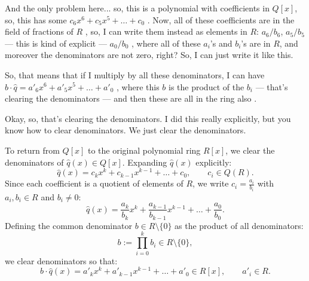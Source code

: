 \begin{proofWrapper}
\begin{speech}[00:23:05 - 00:24:54]
And the only problem here... so, this is a polynomial with coefficients in $Q[x]$, so, this has some $c_6 x^6 + c_5 x^5 + \dots + c_0$ . Now, all of these coefficients are in the field of fractions of $R$ , so, I can write them instead as elements in $R$: $a_6 / b_6$, $a_5 / b_5$ --- this is kind of explicit --- $a_0 / b_0$ , where all of these $a_i$'s and $b_i$'s are in $R$, and moreover the denominators are not zero, right? So, I can just write it like this.

So, that means that if I multiply by all these denominators, I can have $b \cdot \hat{q} = a'_6 x^6 + a'_5 x^5 + \dots + a'_0$ , where this $b$ is the product of the $b_i$  --- that's clearing the denominators --- and then these are all in the ring also .

Okay, so, that's clearing the denominators. I did this really explicitly, but you know how to clear denominators. We just clear the denominators.
\end{speech}

\begin{content}
To return from $Q[x]$ to the original polynomial ring $R[x]$, we clear the denominators of $\hat{q}(x) \in Q[x]$. Expanding $\hat{q}(x)$ explicitly:
\[
\hat{q}(x) = c_k x^k + c_{k-1} x^{k-1} + \dots + c_0, \qquad c_i \in Q(R).
\]
Since each coefficient is a quotient of elements of $R$, we write $c_i = \frac{a_i}{b_i}$ with $a_i, b_i \in R$ and $b_i \neq 0$:
\[
\hat{q}(x) = \frac{a_k}{b_k} x^k + \frac{a_{k-1}}{b_{k-1}} x^{k-1} + \dots + \frac{a_0}{b_0}.
\]
Defining the common denominator $b \in R \setminus \{0\}$ as the product of all denominators:
\begin{equation}\label{eq:common-denom-qhat}
b := \prod_{i=0}^k b_i \in R \setminus \{0\},
\end{equation}
we clear denominators so that:
\begin{equation}\label{eq:b-qhat-Rx}
b \cdot \hat{q}(x) = a'_k x^k + a'_{k-1} x^{k-1} + \dots + a'_0 \in R[x], \qquad a'_i \in R.
\end{equation}
\end{content}


\end{proofWrapper}
